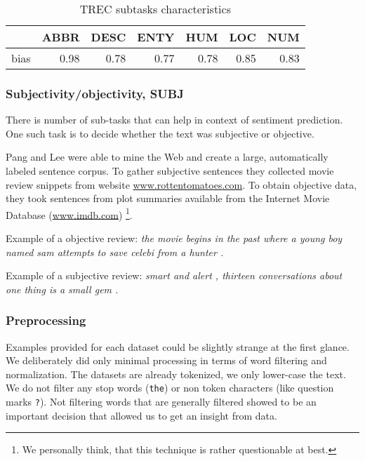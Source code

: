     \begin{table}[h]
    \begin{center}
    
    \begin{tabular}{lrrrrrr}
    \toprule
    {} &  ABBR &  DESC &  ENTY &   HUM &   LOC &   NUM \\
    \midrule
    bias &  0.98 &  0.78 &  0.77 &  0.78 &  0.85 &  0.83 \\
    \bottomrule
    \end{tabular}
    
    \caption[TREC subtasks characteristics]{TREC subtasks characteristics}
    \label{tab:trec:stats}
    \end{center}
    \end{table}

    \subsubsection{Subjectivity/objectivity, SUBJ}
    
    There is number of sub-tasks that can help in context of sentiment prediction.
    One such task is to decide whether the text was subjective or objective.
        
    Pang and Lee were able to mine the Web and create a large, automatically labeled sentence corpus. 
    To gather subjective sentences they collected movie review snippets from website  \url{www.rottentomatoes.com}.
    To obtain objective data, they took sentences from plot summaries available from the Internet Movie Database (\url{www.imdb.com}) \cite{pang2004sentimental} \footnote{We personally think, that this technique is rather questionable at best.}.
    
    Example of a objective review:
    \emph{the movie begins in the past where a young boy named sam attempts to save celebi from a hunter .}

    Example of a subjective review:
    \emph{smart and alert , thirteen conversations about one thing is a small gem .}
    

    \subsubsection{Preprocessing} \label{sec:preprocessing}
    
    Examples provided for each dataset could be slightly strange at the first glance.
    We deliberately did only minimal processing in terms of word filtering and normalization.
    The datasets are already tokenized, we only lower-case the text.
    We do not filter any stop words (\texttt{the}) or non token characters (like question marks \texttt{?}). 
    Not filtering words that are generally filtered showed to be an important decision that allowed us to get an insight from data.
    
